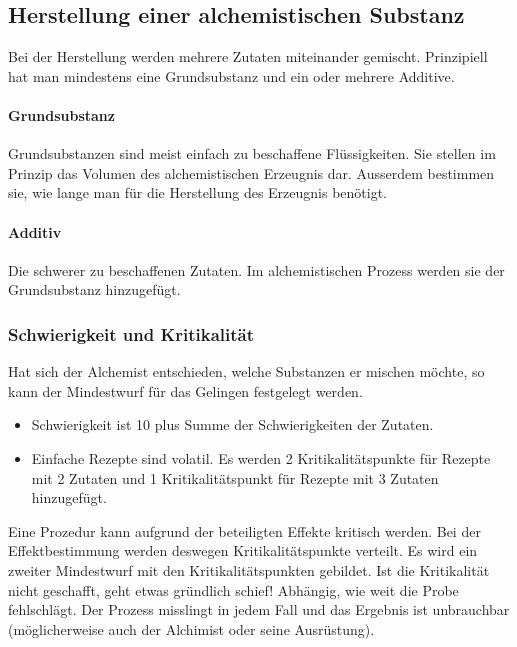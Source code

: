 \documentclass{article}
\begin{document}
\begin{center}
\subsection{Herstellung einer alchemistischen Substanz}
\end{center}

Bei der Herstellung werden mehrere Zutaten miteinander gemischt. Prinzipiell hat man mindestens eine Grundsubstanz und
ein oder mehrere Additive.

\paragraph{Grundsubstanz}

Grundsubstanzen sind meist einfach zu beschaffene Flüssigkeiten. Sie stellen im Prinzip das Volumen des
alchemistischen Erzeugnis dar. Ausserdem bestimmen sie, wie lange man für die Herstellung des Erzeugnis benötigt.

\paragraph{Additiv}

Die schwerer zu beschaffenen Zutaten. Im alchemistischen Prozess werden sie der Grundsubstanz hinzugefügt.

\subsubsection{Schwierigkeit und Kritikalität}

Hat sich der Alchemist entschieden, welche Substanzen er mischen möchte, so kann der Mindestwurf für das Gelingen
festgelegt werden.

\begin{itemize}
\item Schwierigkeit ist 10 plus Summe der Schwierigkeiten der Zutaten.
\item Einfache Rezepte sind volatil. Es werden 2 Kritikalitätspunkte für Rezepte mit 2 Zutaten und 1 Kritikalitätspunkt für Rezepte mit 3 Zutaten hinzugefügt.
\end{itemize}

Eine Prozedur kann aufgrund der beteiligten Effekte kritisch werden. Bei der Effektbestimmung werden deswegen
Kritikalitätspunkte verteilt. Es wird ein zweiter Mindestwurf mit den Kritikalitätspunkten gebildet. Ist die
Kritikalität nicht geschafft, geht etwas gründlich schief! Abhängig, wie weit die Probe fehlschlägt. Der Prozess
misslingt in jedem Fall und das Ergebnis ist unbrauchbar (möglicherweise auch der Alchimist oder seine Ausrüstung).
\end{document}
